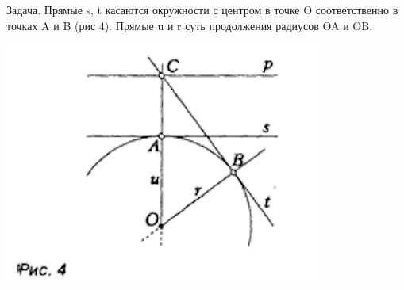 \begin{minipage}{0.3\textwidth}
\hspace{0.1cm} Задача. Прямые s, t касаются окружности с центром в точке O соответственно
в точках A и B (рис 4). Прямые u и r
суть продолжения радиусов OA и OB.

\includegraphics[scale=0.8]{images/Screenshot 2022-12-05 at 19.54.19.png}


\end{minipage}
\hspace{0.3cm}
